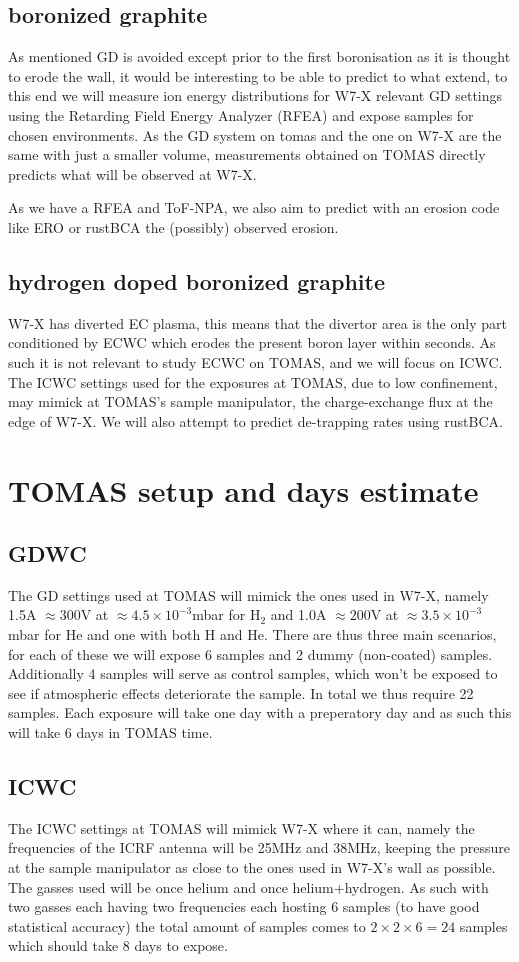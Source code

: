 \documentclass{article}
\begin{document}
\subsection*{boronized graphite}
As mentioned GD is avoided except prior to the  first boronisation as it is
thought to erode the wall, it would be interesting to be able to predict to
what extend, to this end we will measure ion energy distributions for W7-X
relevant GD settings using the Retarding Field Energy Analyzer (RFEA) and
expose samples for chosen environments.  As the GD system on tomas and the one
on W7-X are the same with just a smaller volume, measurements obtained on TOMAS
directly predicts what will be observed at W7-X.

As we have a RFEA and ToF-NPA, we also aim to predict with an erosion code like
ERO or rustBCA the (possibly) observed erosion. 
\subsection*{hydrogen doped boronized graphite}
W7-X has diverted EC plasma, this means that the divertor area is the only part
conditioned by ECWC which erodes the present boron layer within seconds.  As
such it is not relevant to study ECWC on TOMAS, and we will focus on ICWC.  The
ICWC settings used for the exposures at TOMAS, due to low confinement, may
mimick at TOMAS's sample manipulator, the charge-exchange flux at the edge of
W7-X.  We will also attempt to predict de-trapping rates using rustBCA.
\section{TOMAS setup and days estimate}
\subsection*{GDWC}
The GD settings used at TOMAS will mimick the ones used in W7-X, namely 1.5A
$\approx300$V at $\approx4.5\times10^{-3}$mbar  for H$_2$ and 1.0A $\approx
200$V at $\approx 3.5\times10^{-3}$mbar for He\cite{AndreiNucMatEn} and one with
both H and He.  
There are thus three main scenarios, for each of these we will expose 6 samples
and 2 dummy (non-coated) samples. Additionally 4 samples will serve as control
samples, which won't be exposed to see if atmospheric effects deteriorate the
sample. In total we thus require 22 samples.  Each exposure will take one day
with a preperatory day and as such this will take 6 days in TOMAS time.
\subsection*{ICWC}
The ICWC settings at TOMAS will mimick W7-X where it can, namely the
frequencies of the ICRF antenna will be 25MHz and 38MHz, keeping the pressure
at the sample manipulator as close to the ones used in W7-X's wall as possible.
The gasses used will be once helium and once helium+hydrogen. As such with two
gasses each having two frequencies each hosting 6 samples (to have good
statistical accuracy) the total amount of samples comes to $2\times 2\times
6=24$ samples which should take 8 days to expose.
\end{document}
